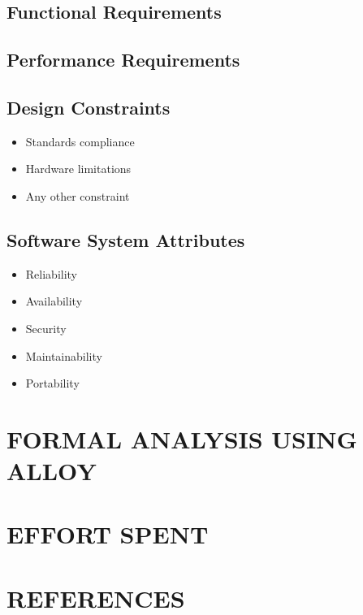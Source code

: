 \documentclass{article}
\begin{document}
\subsection{Functional Requirements}	
\subsection{Performance Requirements}
\subsection{Design Constraints}
		\begin{itemize}
			\item Standards compliance
			\item Hardware limitations
			\item Any other constraint
		\end{itemize}
\subsection{Software System Attributes}	
		\begin{itemize}
			\item Reliability
			\item Availability
			\item Security
			\item Maintainability
			\item Portability
		\end{itemize}


\section{FORMAL ANALYSIS USING ALLOY}

\section{EFFORT SPENT}

\section{REFERENCES}
\end{document}

